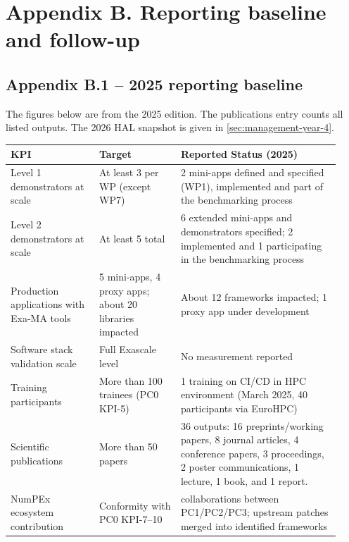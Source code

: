 \clearpage
\section*{Appendix B. Reporting baseline and follow-up}
\label{sec:appendix-b}

\subsection*{Appendix B.1 -- 2025 reporting baseline}
\label{sec:appendix-b1}

The figures below are from the 2025 edition. The publications entry
counts all listed outputs. The 2026 HAL snapshot is given in
\cref{sec:management-year-4}.

\begin{center}
\small
\begin{tabular}{@{}p{0.25\linewidth}p{0.23\linewidth}p{0.45\linewidth}@{}}
\toprule
\textbf{KPI} & \textbf{Target} & \textbf{Reported Status (2025)} \\
\midrule
Level 1 demonstrators at scale & At least 3 per WP (except WP7) & 2 mini-apps defined and specified (WP1), implemented and part of the benchmarking process \\
Level 2 demonstrators at scale & At least 5 total & 6 extended mini-apps and demonstrators specified; 2 implemented and 1 participating in the benchmarking process \\
Production applications with Exa-MA tools & 5 mini-apps, 4 proxy apps; about 20 libraries impacted & About 12 frameworks impacted; 1 proxy app under development \\
Software stack validation scale & Full Exascale level & No measurement reported \\
Training participants & More than 100 trainees (PC0 KPI-5) & 1 training on CI/CD in HPC environment (March 2025, 40 participants via EuroHPC)\\
Scientific publications & More than 50 papers & 36 outputs: 16 preprints/working papers, 8 journal articles, 4 conference papers, 3 proceedings, 2 poster communications, 1 lecture, 1 book, and 1 report. \\
NumPEx ecosystem contribution & Conformity with PC0 KPI-7--10 & collaborations between PC1/PC2/PC3; upstream patches merged into identified frameworks \\
\bottomrule
\end{tabular}
\end{center}


